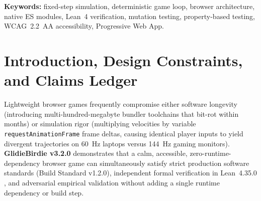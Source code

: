 \documentclass[11pt,letterpaper]{article}
\theoremstyle{remark}
\begin{document}
\noindent\textbf{Keywords:} fixed-step simulation, deterministic game loop, browser architecture, native ES modules, Lean~4 verification, mutation testing, property-based testing, WCAG~2.2~AA accessibility, Progressive Web App.

\section{Introduction, Design Constraints, and Claims Ledger}
\label{sec:intro}

Lightweight browser games frequently compromise either software longevity (introducing multi-hundred-megabyte bundler toolchains that bit-rot within months) or simulation rigor (multiplying velocities by variable \texttt{requestAnimationFrame} frame deltas, causing identical player inputs to yield divergent trajectories on 60~Hz laptops versus 144~Hz gaming monitors). \textbf{GlidieBirdie v3.2.0} demonstrates that a calm, accessible, zero-runtime-dependency browser game can simultaneously satisfy strict production software standards (Build Standard v1.2.0), independent formal verification in Lean~4.35.0 \cite{demoura2021}, and adversarial empirical validation without adding a single runtime dependency or build step.
\end{document}
